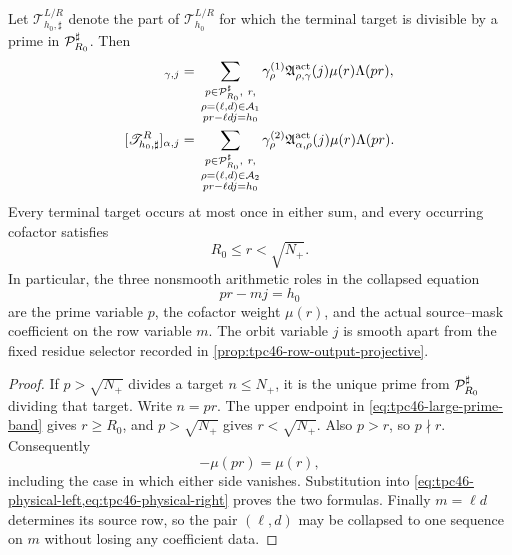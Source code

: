 \begin{proposition}
\label{prop:tpc46-physical-determinant-sector}
Let \(\mathscr T_{h_0,\sharp}^{L/R}\) denote the part of
\(\mathscr T_{h_0}^{L/R}\) for which the terminal target is divisible
by a prime in \(\mathcal P_{R_0}^{\sharp}\).  Then
\begin{align}
 [\mathscr T_{h_0,\sharp}^{L}]_{\gamma,j}
 &={}
 \sum_{\substack{p\in\cP_{R_0}^{\sharp},\ r,\\
                   \rho=(\ell,d)\in\cA_1\\
                   pr-\ell dj=h_0}}
 \gamma_\rho^{(1)}
 \mathfrak A_{\rho,\gamma}^{\rm act}(j)
 \mu(r)\Lambda(pr),
 \label{eq:tpc46-left-determinant-sector}\\
 [\mathscr T_{h_0,\sharp}^{R}]_{\alpha,j}
 &={}
 \sum_{\substack{p\in\cP_{R_0}^{\sharp},\ r,\\
                   \rho=(\ell,d)\in\cA_2\\
                   pr-\ell dj=h_0}}
 \gamma_\rho^{(2)}
 \mathfrak A_{\alpha,\rho}^{\rm act}(j)
 \mu(r)\Lambda(pr).
 \label{eq:tpc46-right-determinant-sector}
\end{align}
Every terminal target occurs at most once in either sum, and every
occurring cofactor satisfies
\begin{equation}
 R_0\le r<\sqrt{N_+}.
 \label{eq:tpc46-r-range}
\end{equation}
In particular, the three nonsmooth arithmetic roles in the collapsed
equation
\begin{equation}
 pr-mj=h_0
 \label{eq:tpc46-three-slot-equation}
\end{equation}
are the prime variable \(p\), the cofactor weight \(\mu(r)\), and the
actual source--mask coefficient on the row variable \(m\).  The orbit
variable \(j\) is smooth apart from the fixed residue selector recorded
in \cref{prop:tpc46-row-output-projective}.
\end{proposition}

\begin{proof}
If \(p>\sqrt{N_+}\) divides a target \(n\le N_+\), it is the unique
prime from \(\mathcal P_{R_0}^{\sharp}\) dividing that target.  Write
\(n=pr\).  The upper endpoint in
\eqref{eq:tpc46-large-prime-band} gives \(r\ge R_0\), and
\(p>\sqrt{N_+}\) gives \(r<\sqrt{N_+}\).  Also \(p>r\), so
\(p\nmid r\).  Consequently
\begin{equation}
 -\mu(pr)=\mu(r),
 \label{eq:tpc46-target-sign-descent}
\end{equation}
including the case in which either side vanishes.  Substitution into
\cref{eq:tpc46-physical-left,eq:tpc46-physical-right} proves the two
formulas.  Finally \(m=\ell d\) determines its source row, so the pair
\((\ell,d)\) may be collapsed to one sequence on \(m\) without losing
any coefficient data.
\end{proof}

